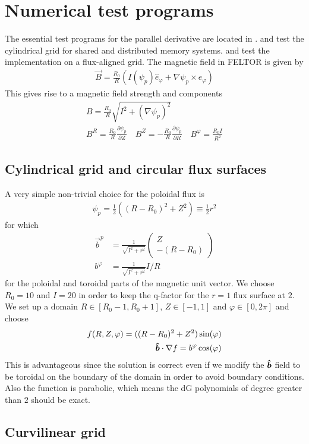 \section{Numerical test programs}
The essential test programs for the parallel derivative are located in 
.
 and  test the cylindrical grid for shared and distributed memory 
systems.  and  test the implementation
on a flux-aligned grid.
The magnetic field in FELTOR is given by
\begin{align}
  \vec B = \frac{R_0}{R}( I(\psi_p) \hat e_\varphi + \nabla\psi_p \times\hat e_\varphi)
\end{align}
This gives rise to a magnetic field strength and components
\begin{align}
  B = \frac{R_0}{R} \sqrt{ I^2 + \left( \nabla\psi_p \right)^2} \\
  B^R = \frac{R_0}{R}\frac{\partial\psi_p}{\partial Z} \quad
  B^Z = -\frac{R_0}{R}\frac{\partial\psi_p}{\partial R}\quad 
  B^\varphi = \frac{R_0I}{R^2}
  \label{}
\end{align}
\subsection{Cylindrical grid and circular flux surfaces}
A very simple non-trivial choice for the poloidal flux is
\begin{align}
  \psi_p = \frac{1}{2} \left( (R-R_0)^2 + Z^2 \right) \equiv \frac{1}{2} r^2
  \label{eq:circular}
\end{align}
for which 
\begin{align}
  \vec b^p &= \frac{1}{\sqrt{I^2 + r^2}} \begin{pmatrix} Z \\ -(R-R_0)\end{pmatrix} \\
  b^\varphi &= \frac{1}{\sqrt{I^2 + r^2}} I/R
  \label{}
\end{align}
for the poloidal and toroidal parts of the magnetic unit vector. 
We choose $R_0 = 10$ and $I=20$ in order to keep the q-factor for the $r=1$ flux surface at $2$.
We set up a domain 
$R\in[R_0-1, R_0+1]$,
$Z\in[-1,1]$ and 
$\varphi \in [0,2\pi]$ and choose
\begin{align}
  f(R,Z,\varphi) = ((R-R_0)^2 + Z^2)\sin(\varphi)\\
  \bm{\hat{b}} \cdot \nabla f= b^\varphi \cos(\varphi)
  \label{}
\end{align}
This is advantageous since the solution is correct even if we modify the $\bm{\hat{b}}$ field
to be toroidal on the boundary of the domain in order to avoid boundary conditions. 
Also the function is parabolic, which means the dG polynomials of degree greater than $2$ 
should be exact. 
\subsection{Curvilinear grid}






